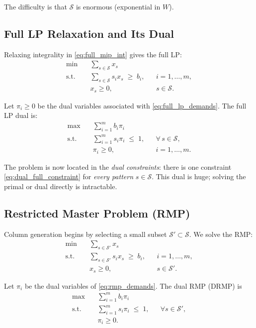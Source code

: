 \documentclass[11pt]{article}
\begin{document}
The difficulty is that $\mathcal{S}$ is enormous (exponential in $W$).

\subsection{Full LP Relaxation and Its Dual}

Relaxing integrality in \eqref{eq:full_mip_int} gives the full LP:
\begin{align}
\min \quad & \sum_{s\in\mathcal{S}} x_s \label{eq:full_lp_obj} \\
\text{s.t.}\quad
& \sum_{s\in\mathcal{S}} s_i x_s \;\ge\; b_i,
   && i=1,\dots,m, \label{eq:full_lp_demands} \\
& x_s \ge 0, && s\in\mathcal{S}. \label{eq:full_lp_nonneg}
\end{align}

Let $\pi_i \ge 0$ be the dual variables associated with
\eqref{eq:full_lp_demands}.
The full LP dual is:
\begin{align}
\max \quad & \sum_{i=1}^m b_i \pi_i
    \label{eq:dual_obj} \\
\text{s.t.}\quad
& \sum_{i=1}^m s_i \pi_i \;\le\; 1,
   && \forall\, s\in\mathcal{S}, \label{eq:dual_full_constraint} \\
& \pi_i \ge 0, && i=1,\dots,m.
    \label{eq:dual_nonneg}
\end{align}

The problem is now located in the \emph{dual constraints}:
there is one constraint \eqref{eq:dual_full_constraint} for
\emph{every pattern} $s\in\mathcal{S}$.
This dual is huge; solving the primal or dual directly is intractable.

\subsection{Restricted Master Problem (RMP)}

Column generation begins by selecting a small subset
$\mathcal{S}'\subset\mathcal{S}$.
We solve the RMP:
\begin{align}
\min \quad & \sum_{s\in\mathcal{S}'} x_s \label{eq:rmp_obj} \\
\text{s.t.}\quad
& \sum_{s\in\mathcal{S}'} s_i x_s \;\ge\; b_i,
    && i=1,\dots,m, \label{eq:rmp_demands} \\
& x_s \ge 0, && s\in\mathcal{S}'. \label{eq:rmp_nonneg}
\end{align}

Let $\pi_i$ be the dual variables of \eqref{eq:rmp_demands}.
The dual RMP (DRMP) is
\begin{align}
\max \quad & \sum_{i=1}^m b_i \pi_i
    \label{eq:drmp_obj} \\
\text{s.t.}\quad
& \sum_{i=1}^m s_i \pi_i \;\le\; 1,
    && \forall s\in\mathcal{S}', \label{eq:drmp_constraints} \\
& \pi_i \ge 0. \label{eq:drmp_nonneg}
\end{align}
\end{document}
